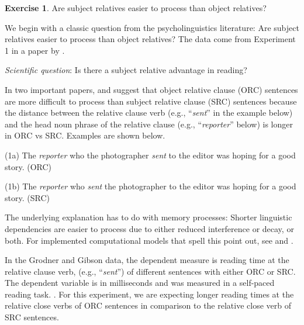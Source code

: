 \documentclass[12pt,]{krantz}
\theoremstyle{definition}
\theoremstyle{definition}
\theoremstyle{definition}
\newtheorem{exercise}{Exercise}[chapter]
\theoremstyle{remark}
\begin{document}
\begin{exercise}
\protect\hypertarget{exr:hierarchical-logn}{}{\label{exr:hierarchical-logn} }Are subject relatives easier to process than object relatives?
\end{exercise}

We begin with a classic question from the psycholinguistics literature: Are subject relatives easier to process than object relatives? The data come from Experiment 1 in a paper by \citet{grodner}.

\emph{Scientific question}: Is there a subject relative advantage in reading?

In two important papers, \citet{gibson00} and \citet{grodner} suggest that object relative clause (ORC) sentences are more difficult to process than subject relative clause (SRC) sentences because the distance between the relative clause verb (e.g., ``\emph{sent}'' in the example below) and the head noun phrase of the relative clause (e.g., ``\emph{reporter}'' below) is longer in ORC vs SRC. Examples are shown below.

(1a) The \emph{reporter} who the photographer \emph{sent} to the editor was hoping for a good story. (ORC)

(1b) The \emph{reporter} who \emph{sent} the photographer to the editor was hoping for a good story. (SRC)

The underlying explanation has to do with memory processes: Shorter linguistic dependencies are easier to process due to either reduced interference or decay, or both. For implemented computational models that spell this point out, see \citet{lewisvasishth:cogsci05} and \citet{EngelmannJaegerVasishthSubmitted2018}.

In the Grodner and Gibson data, the dependent measure is reading time at the relative clause verb, (e.g., ``\emph{sent}'') of different sentences with either ORC or SRC. The dependent variable is in milliseconds and was measured in a self-paced reading task. \citep[Self-paced reading is a task where participants read a sentence or a short text word-by-word or phrase-by-phrase, pressing a button to get the next word or phrase displayed while the previous one disappears;][]{aaronsonPerformanceTheoriesSentence1976, mitchellEffectsContextContent1978}. For this experiment, we are expecting longer reading times at the relative close verbs of ORC sentences in comparison to the relative close verb of SRC sentences.
\end{document}
